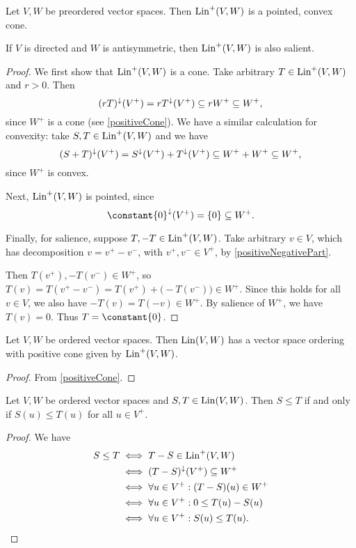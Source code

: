 \begin{proposition}
Let $V,W$ be preordered vector spaces. Then $\operatorname{Lin}^+(V,W)$ is a pointed, convex cone.

If $V$ is directed and $W$ is antisymmetric, then $\operatorname{Lin}^+(V,W)$ is also salient.
\end{proposition}
\begin{proof}
We first show that $\operatorname{Lin}^+(V,W)$ is a cone. Take arbitrary $T\in \operatorname{Lin}^+(V,W)$ and $r>0$. Then
\[ (rT)^\downarrow(V^+) = rT^\downarrow(V^+) \subseteq r W^+ \subseteq W^+, \]
since $W^+$ is a cone (see \ref{positiveCone}).
We have a similar calculation for convexity: take $S,T\in \operatorname{Lin}^+(V,W)$ and we have
\[ (S+T)^\downarrow(V^+) = S^\downarrow(V^+) + T^\downarrow(V^+) \subseteq W^+ + W^+ \subseteq W^+, \]
since $W^+$ is convex.

Next, $\operatorname{Lin}^+(V,W)$ is pointed, since
\[ \constant{0}^\imf(V^+) = \{0\} \subseteq W^+. \]

Finally, for salience, suppose $T, -T \in \operatorname{Lin}^+(V,W)$. Take arbitrary $v\in V$, which has decomposition $v = v^+- v^-$, with $v^+,v^-\in V^+$, by \ref{positiveNegativePart}.

Then $T(v^+), -T(v^-)\in W^+$, so $T(v) = T(v^+ - v^-) = T(v^+)+ \big(-T(v^-)\big) \in W^+$. Since this holds for all $v\in V$, we also have $-T(v) = T(-v) \in W^+$. By salience of $W^+$, we have $T(v)=0$. Thus $T = \constant{0}$.
\end{proof}
\begin{corollary}
Let $V,W$ be ordered vector spaces. Then $\operatorname{Lin}(V,W)$ has a vector space ordering with positive cone given by $\operatorname{Lin}^+(V,W)$.
\end{corollary}
\begin{proof}
From \ref{positiveCone}.
\end{proof}

\begin{lemma} \label{linearOperatorOrdering}
Let $V,W$ be ordered vector spaces and $S,T\in \operatorname{Lin}(V,W)$. Then $S\leq T$ \textup{if and only if} $S(u) \leq T(u)$ for all $u\in V^+$.
\end{lemma}
\begin{proof}
We have
\begin{align*}
S\leq T &\iff T-S \in \operatorname{Lin}^+(V,W) \\
&\iff (T-S)^\downarrow(V^+) \subseteq W^+ \\
&\iff \forall u\in V^+: (T-S)(u) \in W^+ \\
&\iff \forall u\in V^+: 0\leq T(u) - S(u) \\
&\iff \forall u\in V^+: S(u) \leq T(u).
\end{align*}
\end{proof}

